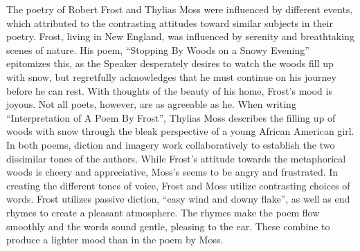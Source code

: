 \begin{spacing}{2}
\begin{linenumbers*}
\modulolinenumbers[5]
\indent The poetry of Robert Frost and Thylias Moss were influenced by different events, which attributed to the contrasting attitudes toward similar subjects in their poetry.  Frost, living in New England, was influenced by serenity and breathtaking scenes of nature. His poem, “Stopping By Woods on a Snowy Evening” epitomizes this, as the Speaker desperately desires to watch the woods fill up with snow, but regretfully acknowledges that he must continue on his journey before he can rest. With thoughts of the beauty of his home, Frost's mood is joyous. Not all poets, however, are as agreeable as he. When writing “Interpretation of A Poem By Frost”, Thylias Moss describes the filling up of woods with snow through the bleak perspective of a young African American girl. In both poems, diction and imagery work collaboratively to establish the two dissimilar tones of the authors. While Frost's attitude towards the metaphorical woods is cheery and appreciative, Moss's seems to be angry and frustrated. In creating the different tones of voice, Frost and Moss utilize contrasting choices of words. Frost utilizes passive diction, “easy wind and downy flake”, as well as end rhymes to create a pleasant atmosphere. The rhymes make the poem flow smoothly and the words sound gentle, pleasing to the ear. These combine to produce a lighter mood than in the poem by Moss. 


\end{linenumbers*}
\end{spacing}
